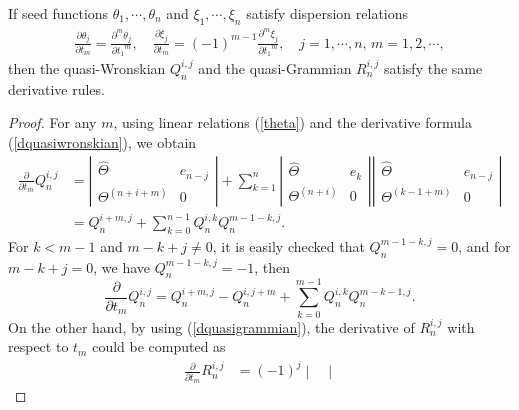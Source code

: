 \documentclass[10pt,a4paper]{amsart}
\begin{document}
\begin{proposition}\label{prop1}
If seed functions $\theta_1,\cdots,\theta_n$ and $\xi_1,\cdots,\xi_n$ satisfy dispersion relations
\begin{align}\label{theta}
 \frac{\partial \theta_j}{\partial t_m} = \frac{\partial^m \theta_j}{\partial {t_1}^m},\quad \frac{\partial \xi_j}{\partial{t_m}}=(-1)^{m-1} \frac{\partial^m \xi_j}{\partial {t_1}^m},
 \quad j=1,\cdots,n,\,m=1,2,\cdots,
\end{align}
then the quasi-Wronskian $Q_n^{i, j}$ and the quasi-Grammian $R_n^{i, j}$ satisfy the same derivative rules.
\end{proposition}

\begin{proof}
For any $m$, using linear relations (\ref{theta}) and the derivative formula (\ref{dquasiwronskian}), we obtain
\begin{align*}
    \frac{\partial}{\partial t_m} Q_n^{i, j} 
    &= \left| \begin{array}{cc}
    \widehat{\Theta} & e_{n-j} \\
    \Theta^{(n+i+m)} & \boxed{0}
    \end{array} \right| 
    + \sum_{k=1}^{n} 
    \left| \begin{array}{cc}
    \widehat{\Theta} & e_k \\
    \Theta^{(n+i)} & \boxed{0}
    \end{array} \right|
    \left| \begin{array}{cc}
    \widehat{\Theta} & e_{n-j} \\
    \Theta^{(k-1+m)} & \boxed{0}
    \end{array} \right| \\
    &= Q_n^{i + m, j} + \sum_{k=0}^{n-1} Q_n^{i,k} Q_n^{m-1-k,j}.
\end{align*}
For $k<m-1$ and $m-k+j\neq0$, it is easily checked that $Q_n^{m-1-k,j}=0$, and for $m-k+j=0$, we have 
$Q_n^{m-1-k,j}=-1$, then 
\begin{equation}\label{deri_quasi}
    \frac{\partial}{\partial t_m} Q_n^{i, j} = Q_n^{i + m, j} - Q_n^{i, j + m} + \sum_{k=0}^{m-1} Q_n^{i, k} Q_n^{m - k - 1, j}.
\end{equation}
On the other hand, by using (\ref{dquasigrammian}), the derivative of $R_n^{i, j}$ with respect to $t_m$ could be computed as
\begin{equation}
    \begin{split}
    \frac{\partial}{\partial t_m} R_n^{i, j} &= (-1)^j \begin{vmatrix}

\end{vmatrix}
\end{split}
\end{equation}
\end{proof}
\end{document}
